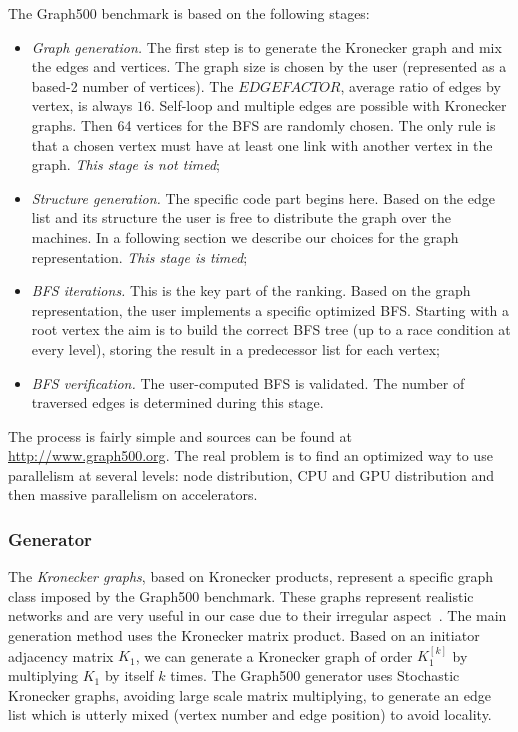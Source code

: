 The Graph500 benchmark is based on the following stages:
\begin{itemize}
	\item \textit{Graph generation.} The first step is to generate the Kronecker graph and mix the edges and vertices. 
	The graph size is chosen by the user (represented as a based-2 number of vertices). The $EDGEFACTOR$, average ratio of edges by vertex, is always $16$. 
	Self-loop and multiple edges are possible with Kronecker graphs.
	Then 64 vertices for the BFS are randomly chosen. 
	The only rule is that a chosen vertex must have at least one link with another vertex in the graph. \textit{This stage is not timed};
	\item \textit{Structure generation.} The specific code part begins here. 
	Based on the edge list and its structure the user is free to distribute the graph over the machines. 
	In a following section we describe our choices for the graph representation. \textit{This stage is timed};
	\item \textit{BFS iterations.} This is the key part of the ranking. Based on the graph representation, the user implements a specific optimized BFS. Starting with a root vertex the aim is to build the correct BFS tree (up to a race condition at every level), storing the result in a predecessor list for each vertex;
	\item \textit{BFS verification.} The user-computed BFS is validated. The number of traversed edges is determined during this stage.  
\end{itemize}

The process is fairly simple and sources can be found at \url{http://www.graph500.org}.
The real problem is to find an optimized way to use parallelism at several levels: node distribution, CPU and GPU distribution and then massive parallelism on accelerators.



\subsubsection{Generator}

The \textit{Kronecker graphs}, based on Kronecker products, represent a specific graph class
imposed by the Graph500 benchmark. 
These graphs represent realistic networks and are very useful in our case due to their irregular aspect~\cite{leskovec2010kronecker}. 
The main generation method uses the Kronecker matrix product. 
Based on an initiator adjacency matrix $K_1$, we can generate a Kronecker graph of order $K_1^{[k]}$ by multiplying $K_1$ by itself $k$ times. 
The Graph500 generator uses Stochastic Kronecker graphs, avoiding large scale matrix multiplying, to generate an edge list which is utterly mixed (vertex number and edge position) to avoid locality. 

